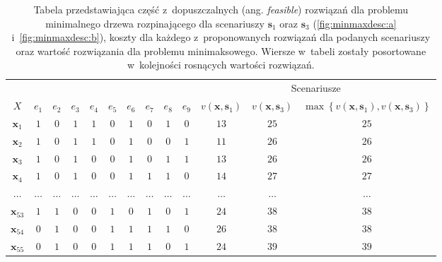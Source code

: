 \begin{table}[!htbp]
	\caption{
		Tabela przedstawiająca część z~dopuszczalnych (ang. \textit{feasible}) rozwiązań dla problemu minimalnego drzewa rozpinającego dla scenariuszy $\textbf{s}_{1}$ oraz $\textbf{s}_{3}$ (\ref{fig:minmaxdesc:a} i~\ref{fig:minmaxdesc:b}), koszty dla każdego z~proponowanych rozwiązań dla podanych scenariuszy oraz wartość rozwiązania dla problemu minimaksowego.
		Wiersze w~tabeli zostały posortowane w~kolejności rosnących wartości rozwiązań.}
	\label{tab:minmaxexample}
	\begin{tabular}{ccccccccccccc}
		\cline{11-13}
		\multicolumn{2}{l}{}       &         &         &         &         &         &         &         &         & \multicolumn{3}{c}{Scenariusze}                                                                                                                                                                                              \\
		$X$              & $e_{1}$ & $e_{2}$ & $e_{3}$ & $e_{4}$ & $e_{5}$ & $e_{6}$ & $e_{7}$ & $e_{8}$ & $e_{9}$ & $v \left( \textbf{x}, \textbf{s}_{1} \right) $ & $ v \left( \textbf{x}, \textbf{s}_{3} \right) $ & $\max \left\{ v \left( \textbf{x}, \textbf{s}_{1} \right), v \left( \textbf{x}, \textbf{s}_{3} \right) \right\} $ \\
		$\textbf{x}_{1}$ & $1$     & $0$     & $1$     & $1$     & $0$     & $1$     & $0$     & $1$	&	$0$	&	$13$	&	$25$	&	$25$	\\
		$\textbf{x}_{2}$ & $1$     & $0$     & $1$     & $1$     & $0$     & $1$     & $0$     & $0$	&	$1$	&	$11$	&	$26$	&	$26$	\\
		$\textbf{x}_{3}$ & $1$     & $0$     & $1$     & $0$     & $0$     & $1$     & $0$     & $1$	&	$1$	&	$13$	&	$26$	&	$26$	\\
		$\textbf{x}_{4}$ & $1$     & $0$     & $1$     & $0$     & $0$     & $1$     & $1$     & $1$	&	$0$	&	$14$	&	$27$	&	$27$	\\
		$\dots$ & $\dots$     & $\dots$     & $\dots$     & $\dots$     & $\dots$     & $\dots$     & $\dots$     & $\dots$	&	$\dots$	&	$\dots$	&	$\dots$	&	$\dots$	\\
		$\textbf{x}_{53}$ & $1$     & $1$     & $0$     & $0$     & $1$     & $0$     & $1$     & $0$	&	$1$	&	$24$	&	$38$	&	$38$	\\
		$\textbf{x}_{54}$ & $0$     & $1$     & $0$     & $0$     & $1$     & $1$     & $1$     & $1$	&	$0$	&	$26$	&	$38$	&	$38$	\\
		$\textbf{x}_{55}$ & $0$     & $1$     & $0$     & $0$     & $1$     & $1$     & $1$     & $0$	&	$1$	&	$24$	&	$39$	&	$39$	\\
		 \hline
	\end{tabular}
\end{table}

